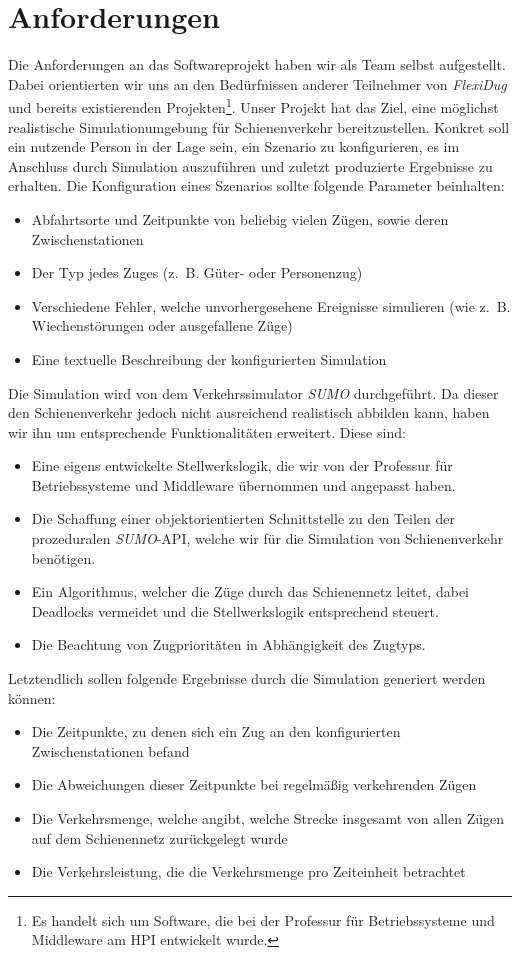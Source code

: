 \section{Anforderungen}
Die Anforderungen an das Softwareprojekt haben wir als Team selbst aufgestellt. Dabei orientierten wir uns an den Bedürfnissen anderer Teilnehmer von \emph{FlexiDug} und bereits existierenden Projekten\footnote{Es handelt sich um Software, die bei der Professur für Betriebssysteme und Middleware am HPI entwickelt wurde.}. Unser Projekt hat das Ziel, eine möglichst realistische Simulationumgebung für Schienenverkehr bereitzustellen. Konkret soll ein nutzende Person in der Lage sein, ein Szenario zu konfigurieren, es im Anschluss durch Simulation auszuführen und zuletzt produzierte Ergebnisse zu erhalten. Die Konfiguration eines Szenarios sollte folgende Parameter beinhalten:
\begin{itemize}
    \item Abfahrtsorte und Zeitpunkte von beliebig vielen Zügen, sowie deren Zwischenstationen
    \item Der Typ jedes Zuges (z.~B. Güter- oder Personenzug)
    \item Verschiedene Fehler, welche unvorhergesehene Ereignisse simulieren (wie z.~B. Wiechenstörungen oder ausgefallene Züge)
    \item Eine textuelle Beschreibung der konfigurierten Simulation
\end{itemize}
Die Simulation wird von dem Verkehrssimulator \emph{SUMO} \cite{noauthor_eclipse_nodate} durchgeführt. Da dieser den Schienenverkehr jedoch nicht ausreichend realistisch abbilden kann, haben wir ihn um entsprechende Funktionalitäten erweitert. Diese sind:
\begin{itemize}
    \item Eine eigens entwickelte Stellwerkslogik, die wir von der Professur für Betriebssysteme und Middleware übernommen und angepasst haben. \cite{noauthor_interlocking_2023}
    \item Die Schaffung einer objektorientierten Schnittstelle zu den Teilen der prozeduralen \emph{SUMO}-API, welche wir für die Simulation von Schienenverkehr benötigen.
    \item Ein Algorithmus, welcher die Züge durch das Schienennetz leitet, dabei Deadlocks vermeidet und die Stellwerkslogik entsprechend steuert.
    \item Die Beachtung von Zugprioritäten in Abhängigkeit des Zugtyps.
\end{itemize}
Letztendlich sollen folgende Ergebnisse durch die Simulation generiert werden können:
\begin{itemize}
    \item Die Zeitpunkte, zu denen sich ein Zug an den konfigurierten Zwischenstationen befand
    \item Die Abweichungen dieser Zeitpunkte bei regelmäßig verkehrenden Zügen
    \item Die Verkehrsmenge, welche angibt, welche Strecke insgesamt von allen Zügen auf dem Schienennetz zurückgelegt wurde
    \item Die Verkehrsleistung, die die Verkehrsmenge pro Zeiteinheit betrachtet
\end{itemize}

